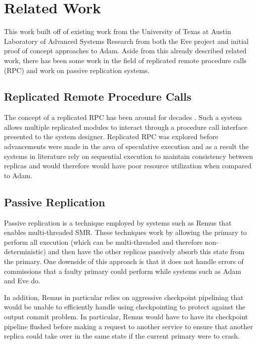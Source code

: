 \documentclass[11pt, oneside]{report}
\begin{document}
\chapter{Related Work}\label{RelatedWork}

This work built off of existing work from the University of Texas at Austin Laboratory of Advanced Systems Research from both the Eve project and initial proof of concept approaches to Adam. Aside from this already described related work, there has been some work in the field of replicated remote procedure calls (RPC) and work on passive replication systems.

\section{Replicated Remote Procedure Calls}

The concept of a replicated RPC has been around for decades \cite{rrpc, ftrpc}. 
Such a system allows multiple replicated modules to interact through a procedure call interface presented to the system designer.
Replicated RPC was explored before advancements were made in the area of speculative execution and as a result the systems in literature rely on sequential execution to maintain consistency between replicas and would therefore would have poor resource utilization when compared to Adam.

\section{Passive Replication}

Passive replication is a technique employed by systems such as Remus \cite{remus} that enables multi-threaded SMR. 
These techniques work by allowing the primary to perform all execution (which can be multi-threaded and therefore non-deterministic) and then have the other replicas passively absorb this state from the primary.
One downside of this approach is that it does not handle errors of commissions that a faulty primary could perform while systems such as Adam and Eve do.

In addition, Remus in particular relies on aggressive checkpoint pipelining that would be unable to efficiently handle using checkpointing to protect against the output commit problem. In particular, Remus would have to have its checkpoint pipeline flushed before making a request to another service to ensure that another replica could take over in the same state if the current primary were to crash.
\end{document}
